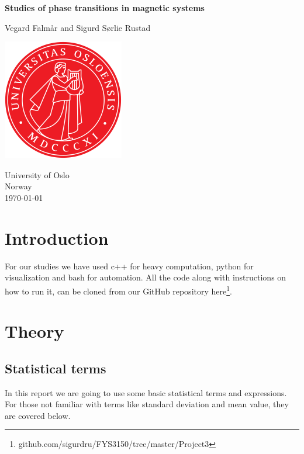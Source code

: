 \documentclass[reprint, english,notitlepage,nofootinbib]{revtex4-1}  %
\begin{document}
\begin{titlepage}
	\begin{center}
	\textbf{Studies of phase transitions in magnetic systems}

	\vspace{0.2cm}
	Vegard Falmår and Sigurd Sørlie Rustad

	\vspace{0.5cm}
	\includegraphics[scale=0.5]{../../pictures/UIO}
	\vspace{0.8cm}

	University of Oslo\\
	Norway\\
	\today	\\
	\end{center}
	\tableofcontents
	\clearpage
\end{titlepage}

\begin{abstract}

\end{abstract}
\maketitle                              %


\section{Introduction}

For our studies we have used c++ for heavy computation, python for visualization and bash for automation. All the code along with instructions on how to run it, can be cloned from our GitHub repository here\footnote{github.com/sigurdru/FYS3150/tree/master/Project3}.

\section{Theory}

\subsection*{Statistical terms}
In this report we are going to use some basic statistical terms and expressions. For those not familiar with terms like standard deviation and mean value, they are covered below.
\end{document}
